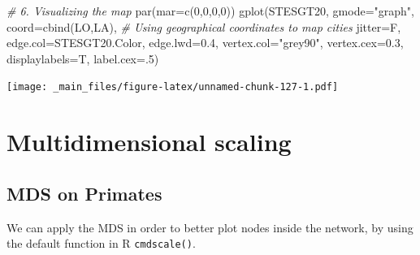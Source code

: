 \documentclass[
  notitlepage,
  onecolumn,
  openany]{book}
\newenvironment{Shaded}{\begin{snugshade}}{\end{snugshade}}
\newcommand{\AttributeTok}[1]{\textcolor[rgb]{0.77,0.63,0.00}{#1}}
\newcommand{\CommentTok}[1]{\textcolor[rgb]{0.56,0.35,0.01}{\textit{#1}}}
\newcommand{\DecValTok}[1]{\textcolor[rgb]{0.00,0.00,0.81}{#1}}
\newcommand{\FloatTok}[1]{\textcolor[rgb]{0.00,0.00,0.81}{#1}}
\newcommand{\FunctionTok}[1]{\textcolor[rgb]{0.00,0.00,0.00}{#1}}
\newcommand{\NormalTok}[1]{#1}
\newcommand{\StringTok}[1]{\textcolor[rgb]{0.31,0.60,0.02}{#1}}
\begin{document}
\begin{Shaded}
\begin{Highlighting}[]
\CommentTok{\# 6. Visualizing the map}
\FunctionTok{par}\NormalTok{(}\AttributeTok{mar=}\FunctionTok{c}\NormalTok{(}\DecValTok{0}\NormalTok{,}\DecValTok{0}\NormalTok{,}\DecValTok{0}\NormalTok{,}\DecValTok{0}\NormalTok{))}
\FunctionTok{gplot}\NormalTok{(STESGT20, }
      \AttributeTok{gmode=}\StringTok{"graph"}\NormalTok{,}
      \AttributeTok{coord=}\FunctionTok{cbind}\NormalTok{(LO,LA), }\CommentTok{\# Using geographical coordinates to map cities}
      \AttributeTok{jitter=}\NormalTok{F,}
      \AttributeTok{edge.col=}\NormalTok{STESGT20.Color,}
      \AttributeTok{edge.lwd=}\FloatTok{0.4}\NormalTok{,}
      \AttributeTok{vertex.col=}\StringTok{"grey90"}\NormalTok{,}
      \AttributeTok{vertex.cex=}\FloatTok{0.3}\NormalTok{,}
      \AttributeTok{displaylabels=}\NormalTok{T, }
      \AttributeTok{label.cex=}\NormalTok{.}\DecValTok{5}\NormalTok{)}
\end{Highlighting}
\end{Shaded}

\texttt{[image: \_main\_files/figure-latex/unnamed-chunk-127-1.pdf]}

\hypertarget{multidimensional-scaling}{%
\section{Multidimensional scaling}\label{multidimensional-scaling}}

\hypertarget{mds-on-primates}{%
\subsection{MDS on Primates}\label{mds-on-primates}}

We can apply the MDS in order to better plot nodes inside the network, by using the default function in R \texttt{cmdscale()}.
\end{document}

